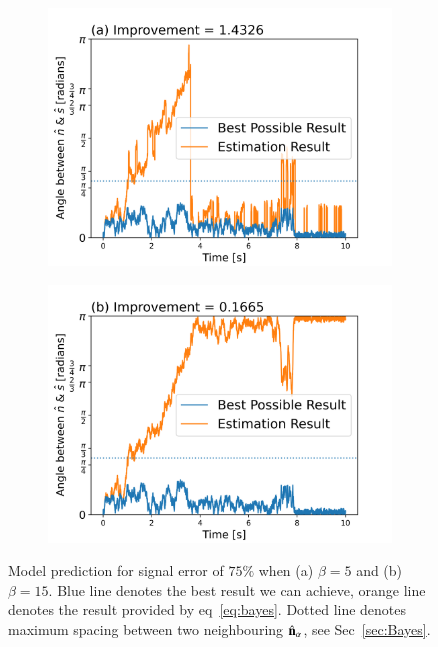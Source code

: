 \documentclass[final,  3p]{elsarticle}
\begin{document}
\begin{figure}[h]
	\centering
	\begin{subfigure}{0.33\textwidth}
		\includegraphics[width=\textwidth]{./Images/fig7a.png}
	\end{subfigure}
	\begin{subfigure}{0.33\textwidth}
		\includegraphics[width=\textwidth]{./Images/fig7b.png}
	\end{subfigure}
	\caption{Model prediction for signal error of $75\%$ when (a) $\beta = 5$ and (b) $\beta=15$. Blue line denotes the best result we can achieve, orange line denotes the result provided by eq~\ref{eq:bayes}. Dotted line denotes maximum spacing between two neighbouring $\hat{\bf n}_\alpha$, see Sec~\ref{sec:Bayes}.}
	\label{fig:beta}
\end{figure}
\end{document}
